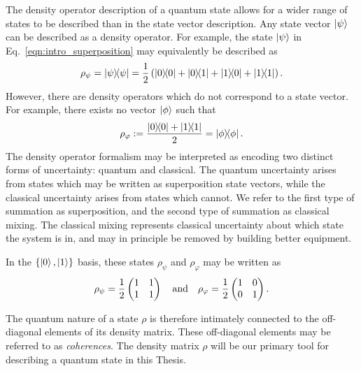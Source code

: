 The density operator description of a quantum state allows for a wider range of states to be described than in the state vector description. Any state vector $\ket{\psi}$ can be described as a density operator. For example, the state $\ket{\psi}$ in Eq.~\ref{eqn:intro_superposition} may equivalently be described as 
\begin{equation}
\rho_\psi = \dyad{\psi}{\psi} = \frac{1}{2} \left(\dyad{0}{0} + \dyad{0}{1} + \dyad{1}{0} + \dyad{1}{1} \right).
\end{equation}
However, there are density operators which do not correspond to a state vector. For example, there exists no vector $\ket{\phi}$ such that
\begin{equation}\label{eqn:intro_mixture}
\rho_{\varphi} := \frac{\dyad{0}{0} + \dyad{1}{1}}{2} = \dyad{\phi}.
\end{equation}
The density operator formalism may be interpreted as encoding two distinct forms of uncertainty: quantum and classical. The quantum uncertainty arises from states which may be written as superposition state vectors, while the classical uncertainty arises from states which cannot. We refer to the first type of summation as superposition, and the second type of summation as classical mixing. The classical mixing represents classical uncertainty about which state the system is in, and may in principle be removed by building better equipment.

In the $\left\{\ket{0}, \ket{1}\right\}$ basis, these states $\rho_\psi$ and $\rho_\varphi$ may be written as
\begin{equation}
\rho_\psi = \frac{1}{2}\pmqty{1 & 1 \\ 1 & 1} \qq{and} \rho_\varphi = \frac{1}{2}\pmqty{1 & 0 \\ 0  & 1}.
\end{equation}

\noindent The quantum nature of a state $\rho$ is therefore intimately connected to the off-diagonal elements of its density matrix. These off-diagonal elements may be referred to as \emph{coherences}. The density matrix $\rho$ will be our primary tool for describing a quantum state in this Thesis.



